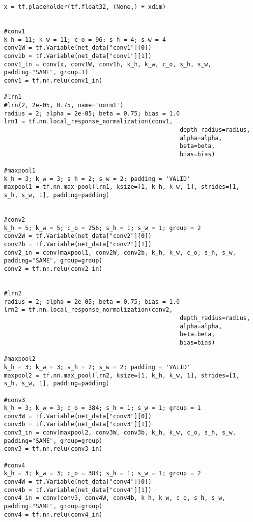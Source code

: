 \begin{lstlisting}
x = tf.placeholder(tf.float32, (None,) + xdim)


#conv1
k_h = 11; k_w = 11; c_o = 96; s_h = 4; s_w = 4
conv1W = tf.Variable(net_data["conv1"][0])
conv1b = tf.Variable(net_data["conv1"][1])
conv1_in = conv(x, conv1W, conv1b, k_h, k_w, c_o, s_h, s_w, padding="SAME", group=1)
conv1 = tf.nn.relu(conv1_in)

#lrn1
#lrn(2, 2e-05, 0.75, name='norm1')
radius = 2; alpha = 2e-05; beta = 0.75; bias = 1.0
lrn1 = tf.nn.local_response_normalization(conv1,
                                                  depth_radius=radius,
                                                  alpha=alpha,
                                                  beta=beta,
                                                  bias=bias)

#maxpool1
k_h = 3; k_w = 3; s_h = 2; s_w = 2; padding = 'VALID'
maxpool1 = tf.nn.max_pool(lrn1, ksize=[1, k_h, k_w, 1], strides=[1, s_h, s_w, 1], padding=padding)


#conv2
k_h = 5; k_w = 5; c_o = 256; s_h = 1; s_w = 1; group = 2
conv2W = tf.Variable(net_data["conv2"][0])
conv2b = tf.Variable(net_data["conv2"][1])
conv2_in = conv(maxpool1, conv2W, conv2b, k_h, k_w, c_o, s_h, s_w, padding="SAME", group=group)
conv2 = tf.nn.relu(conv2_in)


#lrn2
radius = 2; alpha = 2e-05; beta = 0.75; bias = 1.0
lrn2 = tf.nn.local_response_normalization(conv2,
                                                  depth_radius=radius,
                                                  alpha=alpha,
                                                  beta=beta,
                                                  bias=bias)

#maxpool2                                               
k_h = 3; k_w = 3; s_h = 2; s_w = 2; padding = 'VALID'
maxpool2 = tf.nn.max_pool(lrn2, ksize=[1, k_h, k_w, 1], strides=[1, s_h, s_w, 1], padding=padding)

#conv3
k_h = 3; k_w = 3; c_o = 384; s_h = 1; s_w = 1; group = 1
conv3W = tf.Variable(net_data["conv3"][0])
conv3b = tf.Variable(net_data["conv3"][1])
conv3_in = conv(maxpool2, conv3W, conv3b, k_h, k_w, c_o, s_h, s_w, padding="SAME", group=group)
conv3 = tf.nn.relu(conv3_in)

#conv4
k_h = 3; k_w = 3; c_o = 384; s_h = 1; s_w = 1; group = 2
conv4W = tf.Variable(net_data["conv4"][0])
conv4b = tf.Variable(net_data["conv4"][1])
conv4_in = conv(conv3, conv4W, conv4b, k_h, k_w, c_o, s_h, s_w, padding="SAME", group=group)
conv4 = tf.nn.relu(conv4_in)



\end{lstlisting}
